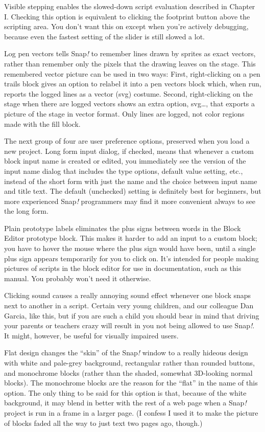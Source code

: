 Visible stepping enables the slowed-down script evaluation described in
Chapter I. Checking this option is equivalent to clicking the footprint
button above the scripting area. You don't want this on except when
you're actively debugging, because even the fastest setting of the
slider is still slowed a lot.

Log pen vectors\label{logpenvectors}{} tells Snap\emph{!}
to remember lines drawn by sprites as exact vectors, rather than
remember only the pixels that the drawing leaves on the stage. This
remembered vector picture can be used in two ways: First, right-clicking
on a pen trails block gives an option to relabel it into a pen vectors
block which, when run, reports the logged lines as a vector (svg)
costume. Second, right-clicking on the stage when there are logged
vectors shows an extra option, svg\ldots, that exports a picture of the
stage in vector format. Only lines are logged, not color regions made
with the fill block.

The next group of four are user preference options, preserved when you
load a new project. Long form input dialog, if checked, means that
whenever a custom block input name is created or edited, you immediately
see the version of the input name dialog that includes the type options,
default value setting, etc., instead of the short form with just the
name and the choice between input name and title text. The default
(unchecked) setting is definitely best for beginners, but more
experienced Snap\emph{!} programmers may find it more convenient always
to see the long form.

Plain prototype labels eliminates the plus signs between words in the
Block Editor prototype block. This makes it harder to add an input to a
custom block; you have to hover the mouse where the plus sign would have
been, until a single plus sign appears temporarily for you to click on.
It's intended for people making pictures of scripts in the block editor
for use in documentation, such as this manual. You probably won't need
it otherwise.

Clicking sound causes a really annoying sound effect whenever one block
snaps next to another in a script. Certain very young children, and our
colleague Dan Garcia, like this, but if you are such a child you should
bear in mind that driving your parents or teachers crazy will result in
you not being allowed to use Snap\emph{!}. It might, however, be useful
for visually impaired users.

Flat design changes the ``skin'' of the Snap\emph{!} window to a really
hideous design with white and pale-grey background, rectangular rather
than rounded buttons, and monochrome blocks (rather than the shaded,
somewhat 3D-looking normal blocks). The monochrome blocks are the reason
for the ``flat'' in the name of this option. The only thing to be said
for this option is that, because of the white background, it may blend
in better with the rest of a web page when a Snap\emph{!} project is run
in a frame in a larger page. (I confess I used it to make the picture of
blocks faded all the way to just text two pages ago, though.)

